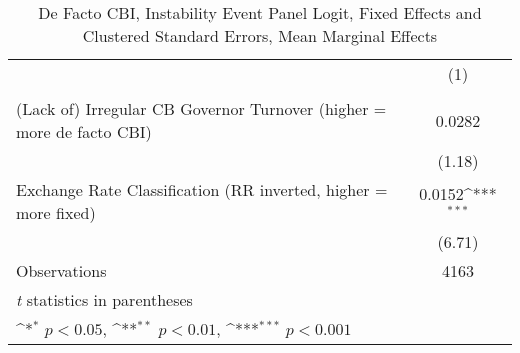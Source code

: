 \begin{table}[htbp]\centering
\def\sym#1{\ifmmode^{#1}\else\(^{#1}\)\fi}
\caption{De Facto CBI, Instability Event Panel Logit, Fixed Effects and Clustered Standard Errors, Mean Marginal Effects \label{margsJustBinInstabEventDJ}}
\begin{tabular*}{\linewidth}{@{\hskip\tabcolsep\extracolsep\fill}l*{1}{c}}
\hline\hline
                &\multicolumn{1}{c}{(1)}\\
                &\multicolumn{1}{c}{}\\
\hline
(Lack of) Irregular CB Governor Turnover (higher = more de facto CBI)&   0.0282         \\
                &   (1.18)         \\
[1em]
Exchange Rate Classification (RR inverted, higher = more fixed)&   0.0152\sym{***}\\
                &   (6.71)         \\
\hline
Observations    &     4163         \\
\hline\hline
\multicolumn{2}{l}{\footnotesize \textit{t} statistics in parentheses}\\
\multicolumn{2}{l}{\footnotesize \sym{*} \(p<0.05\), \sym{**} \(p<0.01\), \sym{***} \(p<0.001\)}\\
\end{tabular*}
\end{table}
